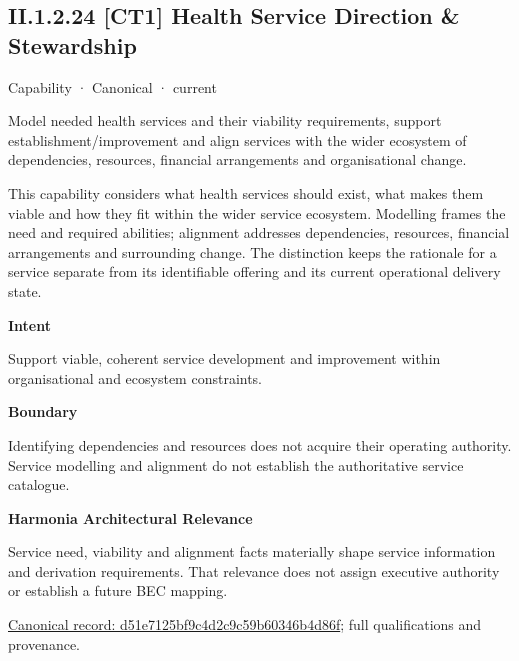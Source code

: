 \subsection*{II.1.2.24 [CT1] Health Service Direction \& Stewardship}
\label{navigation:II.1.2.24}

\label{element:d51e7125bf9c4d2c9c59b60346b4d86f}
{\small Capability · Canonical · current}\par

Model needed health services and their viability requirements, support establishment/improvement and align services with the wider ecosystem of dependencies, resources, financial arrangements and organisational change.



This capability considers what health services should exist, what makes them viable and how they fit within the wider service ecosystem. Modelling frames the need and required abilities; alignment addresses dependencies, resources, financial arrangements and surrounding change. The distinction keeps the rationale for a service separate from its identifiable offering and its current operational delivery state.



\textbf{Intent}



Support viable, coherent service development and improvement within organisational and ecosystem constraints.



\textbf{Boundary}



Identifying dependencies and resources does not acquire their operating authority. Service modelling and alignment do not establish the authoritative service catalogue.



\textbf{Harmonia Architectural Relevance}



Service need, viability and alignment facts materially shape service information and derivation requirements. That relevance does not assign executive authority or establish a future BEC mapping.


{\footnotesize \href{../../../../continuum/strategy/capability/d51e7125bf9c4d2c9c59b60346b4d86f.md}{Canonical record: d51e7125bf9c4d2c9c59b60346b4d86f}; full qualifications and provenance.}\par
